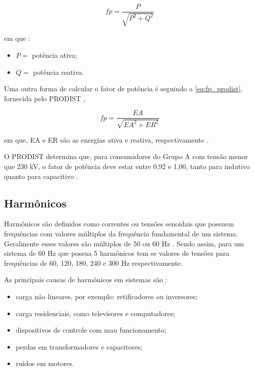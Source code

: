\begin{equation}
  fp = \frac{P}{\sqrt{P^2 + Q^2}}
  \label{eq:fp_glover}
\end{equation}

\noindent
em que \cite{ref:glover_2017}:

\begin{itemize}
  \item $P =$ potência ativa;
  \item $Q =$ potência reativa.
\end{itemize}

Uma outra forma de calcular o fator de potência é seguindo a \autoref{eq:fp_prodist}, fornecida pelo PRODIST \cite{ref:ANEEL2021},

\begin{equation}
  fp = \frac{EA}{\sqrt{EA^2 + ER^2}}
  \label{eq:fp_prodist}
\end{equation}

\noindent
em que, EA e ER são as energias ativa e reativa, respectivamente \cite{ref:ANEEL2021}.

O PRODIST determina que, para consumidores do Grupo A com tensão menor que 230 kV, o fator de potência deve estar entre 0,92 e 1,00, tanto para indutivo quanto para capacitivo \cite{ref:ANEEL2021}.

\subsection{Harmônicos}

Harmônicos são definidos como correntes ou tensões senoidais que possuem frequências com valores múltiplos da frequência fundamental de um sistema. Geralmente esses valores são múltiplos de 50 ou 60 Hz \cite{ref:fuchs_2015}. Sendo assim, para um sistema de 60 Hz que possua 5 harmônicos tem se valores de tensões para frequências de 60, 120, 180, 240 e 300 Hz respectivamente.

As principais causas de harmônicos em sistemas são \cite{ref:fuchs_2015}:

\begin{itemize}
  \item carga não lineares, por exemplo: retificadores ou inversores;
  \item carga residenciais, como televisores e computadores;
  \item dispositivos de controle com mau funcionamento;
  \item perdas em transformadores e capacitores;
  \item ruídos em motores.
\end{itemize}

